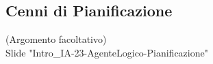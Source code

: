\documentclass[../main.tex]{subfiles}
\begin{document}
	\subsection{Cenni di Pianificazione}
	(Argomento facoltativo)\\
	Slide "Intro\_IA-23-AgenteLogico-Pianificazione"
\end{document}
